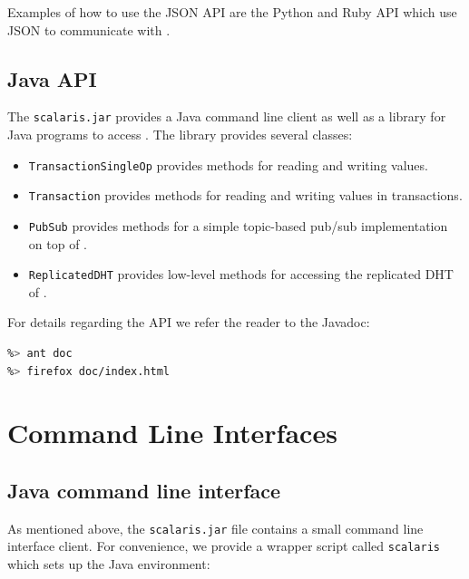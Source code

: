 \documentclass[a4paper]{scrreprt}
\newcommand{\code}[1]{\lstinline[basicstyle=\ttfamily]!#1!}
\begin{document}
Examples of how to use the JSON API are the Python and Ruby API which use JSON
to communicate with \scalaris{}.


\subsection{Java API}

The \code{scalaris.jar} provides a Java command line client as well as a
library for Java programs to access \scalaris{}. The library provides several
classes:

\begin{itemize}
\item \code{TransactionSingleOp} provides methods for reading and writing values.
\item \code{Transaction} provides methods for reading and writing values in transactions.
\item \code{PubSub} provides methods for a simple topic-based pub/sub implementation on top of \scalaris{}.
\item \code{ReplicatedDHT} provides low-level methods for accessing the replicated DHT of \scalaris{}.
\end{itemize}

For details regarding the API we refer the reader to the Javadoc:

\begin{lstlisting}[language=sh]
%> cd java-api
%> ant doc
%> firefox doc/index.html
\end{lstlisting}

\section{Command Line Interfaces}

\subsection{Java command line interface}

As mentioned above, the \code{scalaris.jar} file contains a small command line
interface client. For
convenience, we provide a wrapper script called \code{scalaris} which
sets up the Java environment:
\end{document}
